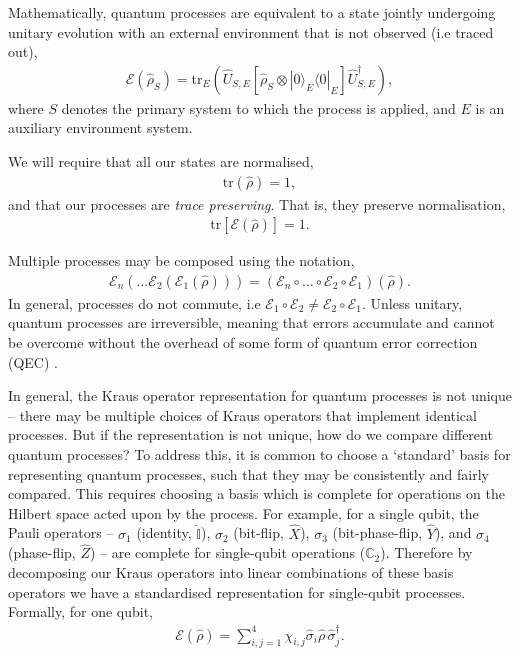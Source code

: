 \documentclass[aps,rmp,twocolumn,amsmath,amssymb,nofootinbib,superscriptaddress]{revtex4}
\newcommand{\bra}[1]{\langle#1|}
\newcommand{\ket}[1]{|#1\rangle}
\begin{document}
Mathematically, quantum processes are equivalent to a state jointly undergoing unitary evolution with an external environment that is not observed (i.e traced out),
\begin{align} \label{eq:proc_environment}
\mathcal{E}(\hat\rho_S) = \mathrm{tr}_E (\hat{U}_{S,E} [\hat\rho_S\otimes \ket{0}_E\bra{0}_E] \hat{U}^\dag_{S,E}),
\end{align}
where $S$ denotes the primary system to which the process is applied, and $E$ is an auxiliary environment system.

We will require that all our states are normalised,
\begin{align}
\mathrm{tr}(\hat\rho) = 1,
\end{align}
and that our processes are \emph{trace preserving}. That is, they preserve normalisation,
\begin{align}
\mathrm{tr}[\mathcal{E}(\hat\rho)] = 1.
\end{align}

Multiple processes may be composed using the notation,
\begin{align}
\mathcal{E}_n(\dots \mathcal{E}_2(\mathcal{E}_1(\hat\rho)))=(\mathcal{E}_n \circ \dots \circ \mathcal{E}_2\circ\mathcal{E}_1)(\hat\rho).
\end{align}
In general, processes do not commute, i.e \mbox{$\mathcal{E}_1\circ \mathcal{E}_2 \neq \mathcal{E}_2\circ \mathcal{E}_1$}. Unless unitary, quantum processes are irreversible, meaning that errors accumulate and cannot be overcome without the overhead of some form of quantum error correction (QEC) \cite{bib:Shor95, bib:CalderbankShor96, bib:NielsenChuang00}.

In general, the Kraus operator representation for quantum processes is not unique -- there may be multiple choices of Kraus operators that implement identical processes. But if the representation is not unique, how do we compare different quantum processes? To address this, it is common to choose a `standard' basis for representing quantum processes, such that they may be consistently and fairly compared. This requires choosing a basis which is complete for operations on the Hilbert space acted upon by the process. For example, for a single qubit, the Pauli operators -- $\sigma_1$ (identity, $\mathbb{\hat{I}}$), $\sigma_2$ (bit-flip, $\hat{X}$), $\sigma_3$ (bit-phase-flip, $\hat{Y}$), and $\sigma_4$ (phase-flip, $\hat{Z}$) -- are complete for single-qubit operations ($\mathbb{C}_2$). Therefore by decomposing our Kraus operators into linear combinations of these basis operators we have a standardised representation for single-qubit processes. Formally, for one qubit,
\begin{align}
\mathcal{E}(\hat\rho) = \sum_{i,j=1}^4 \chi_{i,j} \hat{\sigma}_i\hat\rho\,\hat{\sigma}_j^\dag.
\end{align}
\end{document}
